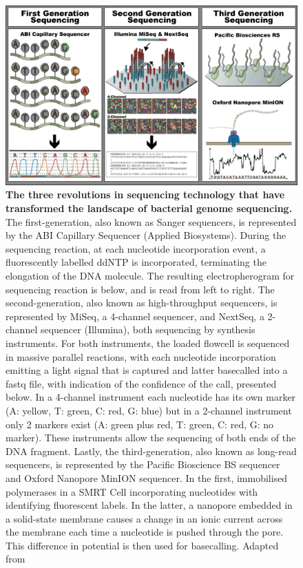 \begin{figure}[h!]
\centering
\includegraphics[width=\textwidth]{figures/introduction/Figure 5.png}
\caption{\textbf{The three revolutions in sequencing technology that have transformed the landscape of bacterial genome sequencing.} The first-generation, also known as Sanger sequencers, is represented by the ABI Capillary Sequencer (Applied Biosystems). During the sequencing reaction, at each nucleotide incorporation event, a fluorescently labelled ddNTP is incorporated, terminating the elongation of the DNA molecule. The resulting electropherogram for sequencing reaction is below, and is read from left to right. The second-generation, also known as high-throughput sequencers, is represented by MiSeq, a 4-channel sequencer, and NextSeq, a 2-channel sequencer (Illumina), both sequencing by synthesis instruments. For both instruments, the loaded flowcell is sequenced in massive parallel reactions, with each nucleotide incorporation emitting a light signal that is captured and latter basecalled into a fastq file, with indication of the confidence of the call, presented below. In a 4-channel instrument each nucleotide has its own marker (A: yellow, T: green, C: red, G: blue) but in a 2-channel instrument only 2 markers exist (A: green plus red, T: green, C: red, G: no marker). These instruments allow the sequencing of both ends of the DNA fragment. Lastly, the third-generation, also known as long-read sequencers, is represented by the Pacific Bioscience BS sequencer and Oxford Nanopore MinION sequencer. In the first, immobilised polymerases in a SMRT Cell incorporating nucleotides with identifying fluorescent labels. In the latter, a nanopore embedded in a solid-state membrane causes a change in an ionic current across the membrane each time a nucleotide is pushed through the pore. This difference in potential is then used for basecalling. Adapted from \cite{hagemann_overview_2015, loman_twenty_2015,goodwin_coming_2016, wang_nanopore_2021, metzker_sequencing_2010, xu_recent_2020}}
\label{fig:figure5}
\end{figure}

